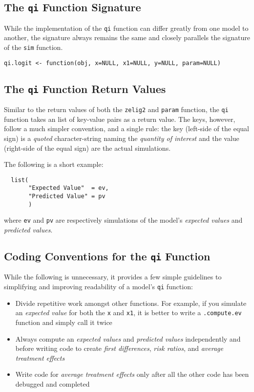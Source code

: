 \documentclass{article}
\newcommand{\code}[1]{{\tt #1}}
\begin{document}
\subsection{The \code{qi} Function Signature}

While the implementation of the \code{qi} function can differ greatly from one
model to another, the signature always remains the same and closely parallels the 
signature of the \code{sim} function.


\begin{verbatim}
qi.logit <- function(obj, x=NULL, x1=NULL, y=NULL, param=NULL)
\end{verbatim}



\subsection{The \code{qi} Function Return Values}

Similar to the return values of both the \code{zelig2} and \code{param} function,
the \code{qi} function takes an list of key-value pairs as a return value. The keys,
however, follow a much simpler convention, and a single rule: the key (left-side
of the equal sign) is a \emph{quoted} character-string naming the \emph{quantity of
interest} and the value (right-side of the equal sign) are the actual simulations.

The following is a short example:

\begin{verbatim}
  list(
       "Expected Value"  = ev,
       "Predicted Value" = pv
       )
\end{verbatim}

\noindent where \code{ev} and \code{pv} are respectively simulations of the model's
\emph{expected values} and \emph{predicted values}.

\subsection{Coding Conventions for the \code{qi} Function}

While the following is unnecessary, it provides a few simple guidelines to simplifying
and improving readability of a model's \code{qi} function:

\begin{itemize}

	\item Divide repetitive work amongst other functions. For example, if you simulate
		an \emph{expected value} for both the \code{x} and \code{x1}, it is better to 
		write a \code{.compute.ev} function and simply call it twice
		
	\item Always compute an \emph{expected values} and \emph{predicted values} independently
		and before writing code to create \emph{first differences}, \emph{risk ratios}, and
		\emph{average treatment effects}
		
	\item Write code for \emph{average treatment effects} only after all the other code has
		been debugged and completed

\end{itemize}
\end{document}
